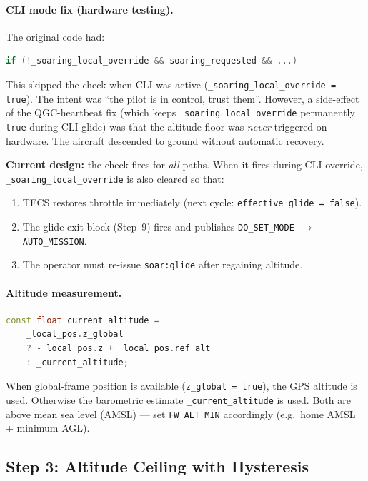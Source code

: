\documentclass[12pt,a4paper]{article}
\begin{document}
\paragraph{CLI mode fix (hardware testing).}
The original code had:
\begin{lstlisting}[language=C++]
if (!_soaring_local_override && soaring_requested && ...)
\end{lstlisting}
This skipped the check when CLI was active (\texttt{\_soaring\_local\_override = true}).
The intent was ``the pilot is in control, trust them''. However, a side-effect of
the QGC-heartbeat fix (which keeps \texttt{\_soaring\_local\_override} permanently
\texttt{true} during CLI glide) was that the altitude floor was \emph{never}
triggered on hardware. The aircraft descended to ground without automatic recovery.

\textbf{Current design:} the check fires for \emph{all} paths.
When it fires during CLI override, \texttt{\_soaring\_local\_override} is also
cleared so that:
\begin{enumerate}
  \item TECS restores throttle immediately (next cycle: \texttt{effective\_glide = false}).
  \item The glide-exit block (Step~9) fires and publishes \texttt{DO\_SET\_MODE
        $\to$ AUTO\_MISSION}.
  \item The operator must re-issue \texttt{soar:glide} after regaining altitude.
\end{enumerate}

\paragraph{Altitude measurement.}
\begin{lstlisting}[language=C++]
const float current_altitude =
    _local_pos.z_global
    ? -_local_pos.z + _local_pos.ref_alt
    : _current_altitude;
\end{lstlisting}
When global-frame position is available (\texttt{z\_global = true}), the GPS
altitude is used. Otherwise the barometric estimate \texttt{\_current\_altitude}
is used. Both are above mean sea level (AMSL) — set \texttt{FW\_ALT\_MIN}
accordingly (e.g.\ home AMSL + minimum AGL).

\subsection{Step 3: Altitude Ceiling with Hysteresis}
\end{document}
